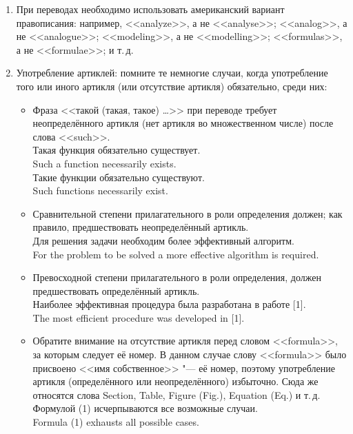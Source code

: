 \documentclass[a5paper, 10pt, twoside, numbers=enddot]{scrartcl}
\begin{document}
 
\begin{enumerate}
  \item	При переводах необходимо использовать американский вариант правописания: например, <<analyze>>, а не <<analyse>>; <<analog>>, а не <<analogue>>; <<modeling>>, а не <<modelling>>; <<formulas>>, а не <<formulae>>; и т.\,д.

  \item Употребление артиклей: помните те немногие случаи, когда употребление того или иного артикля (или отсутствие артикля) обязательно, среди них:
  \begin{itemize}   
    \item Фраза <<такой (такая, такое) \ldots>> при переводе требует неопределённого артикля (нет артикля во множественном числе) после слова <<such>>. \\ [4pt] \textsf{
	   Такая функция обязательно существует. \\ 
	   Such a function necessarily exists. \\ [4pt]
     Такие функции обязательно существуют. \\
     Such functions necessarily exist.}

   \item Сравнительной степени прилагательного в роли определения должен; как правило, предшествовать неопределённый артикль. \\ [4pt] \textsf{
     Для решения задачи необходим более эффективный алгоритм. \\
     For the problem to be solved a more effective algorithm is required.}
     
   \item Превосходной степени прилагательного в роли определения, должен предшествовать определённый артикль. \\ [4pt] \textsf{
     Наиболее эффективная процедура была разработана в работе [1]. \\
     The most efficient procedure was developed in [1].}

   \item Обратите внимание на отсутствие артикля перед словом <<formula>>, за которым следует её номер. В данном случае слову <<formula>> было присвоено <<имя собственное>> "--- её номер, поэтому употребление артикля (определённого или неопределённого) избыточно. Сюда же относятся слова Section, Table, Figure (Fig.), Equation (Eq.) и т.\,д. \\ [4pt] \textsf{
     Формулой (1) исчерпываются все возможные случаи. \\
     Formula (1) exhausts all possible cases.}
  

\end{itemize}
\end{enumerate}
\end{document}
